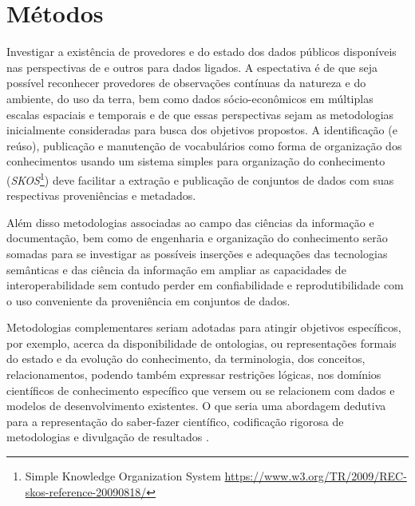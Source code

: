 \documentclass[
	12pt,				%
	openany,			%
	oneside,			%
	a4paper,			%
	english,			%
	french,				%
	spanish,			%
	brazil,				%
	]{abntex2}
\begin{document}
\section{Métodos}

Investigar a existência de provedores e do estado dos dados públicos disponíveis nas perspectivas de  e outros \cite{bizer_linked_2009} para dados ligados. A espectativa é de que seja possível reconhecer provedores de observações contínuas da natureza e do ambiente, do uso da terra, bem como dados sócio-econômicos em múltiplas escalas espaciais e temporais e de que essas perspectivas sejam as metodologias inicialmente consideradas para busca dos objetivos propostos. A identificação (e reúso), publicação e manutenção de vocabulários como forma de organização dos conhecimentos usando um sistema simples para organização do conhecimento (\emph{SKOS}\footnote{Simple Knowledge Organization System \url{https://www.w3.org/TR/2009/REC-skos-reference-20090818/}}) deve facilitar a extração e publicação de conjuntos de dados com suas respectivas proveniências e metadados.

Além disso metodologias associadas ao campo das ciências da informação e documentação, bem como de engenharia e organização do conhecimento serão somadas para se investigar as possíveis inserções e adequações das tecnologias semânticas \cite{tim_berners-lee_james_hendler_and_ora_lassila_semantic_2001,berners-lee_publishing_2001,narock_science_2012,ma_semantic_2015,mattoso_addressing_2016} e das ciência da informação \cite{baker_egy:_2009, fox_rise_2012} em ampliar as capacidades de interoperabilidade \cite{cardoso_semantic_2003} sem contudo perder em confiabilidade \cite{gil_towards_2007} e reprodutibilidade \cite{mattoso_addressing_2016} com o uso conveniente da proveniência \cite{lebo_prov-o:_2013} em conjuntos de dados.

Metodologias complementares seriam adotadas para atingir objetivos específicos, por exemplo, acerca da disponibilidade de ontologias, ou representações formais do estado e da evolução do conhecimento, da terminologia, dos conceitos, relacionamentos, podendo também expressar restrições lógicas, nos domínios científicos de conhecimento específico que versem ou se relacionem com dados e modelos de desenvolvimento existentes. O que seria uma abordagem dedutiva para a representação do saber-fazer científico, codificação rigorosa de metodologias e divulgação de resultados \cite{patton_semnext:_2015,mattoso_addressing_2016,diviacco_collaborative_2015}.
\end{document}
